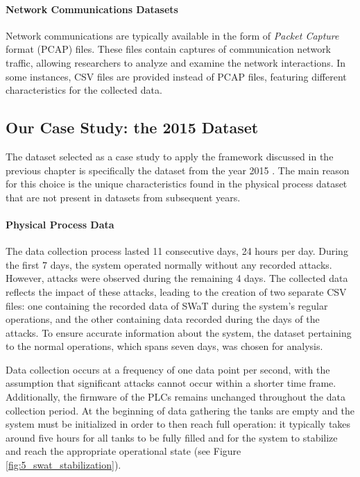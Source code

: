\paragraph{Network Communications Datasets}
Network communications are typically available in the form of \textit{Packet Capture} format (PCAP) files. These files contain captures of communication network traffic, allowing researchers to analyze and examine the network interactions. In some instances, CSV files are provided instead of PCAP files, featuring different characteristics for the collected data.

\subsection{Our Case Study: the 2015 Dataset}
\label{subsec:5_2015_datasets}
The dataset selected as a case study to apply the framework discussed in the previous chapter is specifically the dataset from the year 2015 \cite{swat_dataset2015}. The main reason for this choice is the unique characteristics found in the physical process dataset that are not present in datasets from subsequent years.

\paragraph{Physical Process Data}
The data collection process lasted 11 consecutive days, 24 hours per day. During the first 7 days, the system operated normally without any recorded attacks. However, attacks were observed during the remaining 4 days. The collected data reflects the impact of these attacks, leading to the creation of two separate CSV files: one containing the recorded data of SWaT during the system's regular operations, and the other containing data recorded during the days of the attacks. To ensure accurate information about the system, the dataset pertaining to the normal operations, which spans seven days, was chosen for analysis.

\bigskip
Data collection occurs at a frequency of one data point per second, with the assumption that significant attacks cannot occur within a shorter time frame. Additionally, the firmware of the PLCs remains unchanged throughout the data collection period.\newline
At the beginning of data gathering the tanks are empty and the system must be initialized in order to then reach full operation: it typically takes around five hours for all tanks to be fully filled and for the system to stabilize and reach the appropriate operational state (see Figure \ref{fig:5_swat_stabilization}).

